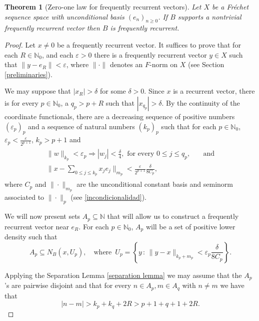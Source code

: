 \documentclass[11pt]{amsart}
\newtheorem{theorem}{Theorem}[section]
\newcommand{\zN}{\mathbb N}
\newcommand{\sub}{\subseteq}
\begin{document}
\begin{theorem}[Zero-one law for frequently recurrent vectors]\label{0-1 law frequent recurrence}
Let $X$ be a Fr\'echet sequence space with unconditional basis $(e_n)_{n\geq 0}$. If $B$ supports a nontrivial frequently recurrent vector then $B$ is frequently recurrent.
\end{theorem}

\begin{proof}
Let $x\neq 0$ be a frequently recurrent vector. It suffices to prove that for each $R\in\mathbb N_0$, and each $\varepsilon>0$ there is a frequently recurrent vector $y\in X$ such that $\|y-e_R\|<\varepsilon$, where $\|\cdot\|$ denotes an $F$-norm on $X$ (see Section \ref{preliminaries}). 

We may suppose that   $|x_R|>\delta$ for some $\delta>0$.   
Since $x$ is a recurrent vector,  there is for every $p\in\mathbb N_0$, a  $q_p>p+R$ such that $|x_{q_p}|>\delta$. By the continuity of the coordinate functionals,  there are a decreasing sequence of positive numbers $(\varepsilon_p)_p$ and a sequence of natural numbers $(k_p)_p$ such that for each $p\in\mathbb N_0$, $\varepsilon_{p}<\frac{\varepsilon}{2^{p+1}}$, $k_p>p+1$ and   
\begin{align}\label{eq: beta_p (zero one freq) UNIL}
 \begin{split}
  \|w\|_{k_p}<\varepsilon_{p}\Longrightarrow  |w_{j}|<\frac{\delta}{4} ,  \text{ for every } 0\leq j\leq q_p, &\quad \text{and}\\
 \|x-\sum_{0\leq j\le k_p} x_j e_j\|_{m_p}<\frac{\varepsilon}{2^{p+1}}\frac{\delta}{8C_p},&
 \end{split}
 \end{align}
 where $C_p$ and $\|\cdot\|_{m_p}$ are the unconditional constant basis and seminorm associated to $\|\cdot\|_p$ (see \eqref{incondicionalidad}). 



We will now present sets $A_p\sub \zN$  that will allow us to construct a frequently recurrent vector near $e_R$. For each $p\in\mathbb N_0$, $A_p$ will be a set of positive lower  density such that  
\begin{equation}\label{eq: A_p zero one freq}
A_p\sub N_B(x,U_p),\quad\text{where }\, U_p=\left\{y\,:\, \|y-x\|_{k_p+m_p}<\varepsilon_p\frac{\delta}{8C_p}\right\}.
\end{equation}

Applying the Separation Lemma \ref{separation lemma}
we may assume that the $A_p$'s are pairwise disjoint and that for every $n\in A_p,m\in A_q$ with $n\neq m$ we have that
\begin{equation}\label{eq separation zero one freq}
|n-m|>k_p+k_q+2R>p+1+q+1+2R.    
\end{equation}


\end{proof}
\end{document}
